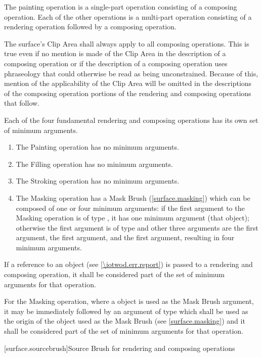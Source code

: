 \pnum
The painting operation is a single-part operation consisting of a composing operation. Each of the other operations is a multi-part operation consisting of a rendering operation followed by a composing operation.

\pnum
The surface's Clip Area shall always apply to all composing operations. This is true even if no mention is made of the Clip Area in the description of a composing operation or if the description of a composing operation uses phraseology that could otherwise be read as being unconstrained.
\enternote
Because of this, mention of the applicability of the Clip Area will be omitted in the descriptions of the composing operation portions of the rendering and composing operations that follow.
\exitnote

\pnum
Each of the four fundamental rendering and composing operations has its own set of minimum arguments.
\begin{enumerate}
	\item The Painting operation has no minimum arguments.
	\item The Filling operation has no minimum arguments.
	\item The Stroking operation has no minimum arguments.
	\item The Masking operation has a Mask Brush (\ref{surface.masking}) which can be composed of one or four minimum arguments: if the first argument to the Masking operation is of type , it has one minimum argument (that  object); otherwise the first argument is of type  and other three arguments are the first  argument, the first  argument, and the first  argument, resulting in four minimum arguments.
\end{enumerate}

\pnum
If a reference to an  object (see \ref{\iotwod.err.report}) is passed to a rendering and composing operation, it shall be considered part of the set of minimum arguments for that operation.

\pnum
For the Masking operation, where a  object is used as the Mask Brush argument, it may be immediately followed by an argument of type  which shall be used as the origin of the  object used as the Mask Brush (see \ref{surface.masking}) and it shall be considered part of the set of minimum arguments for that operation.

 [surface.sourcebrush]{Source Brush for rendering and composing operations}

